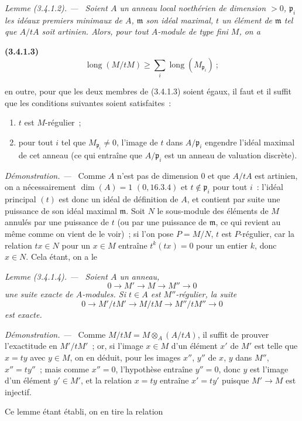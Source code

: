 \documentclass[10pt,oneside]{book}
\newcommand{\oldpage}[2][]{%
  \setcounter{footnote}{0}%
  \marginpar{\scriptsize\textbf{#1}~|~#2}\ignorespaces}
\newenvironment{env}[1][]{\par\medskip\noindent\textbf{(#1)}\ }{\par}
\newenvironment{lemma}[1][]{%
  \par\medskip\noindent\itshape Lemme (#1). ---\ }{\par}
\newenvironment{proof}{%
  \par\medskip\noindent\textit{Démonstration. ---\ }}{\par}
\begin{document}
\begin{lemma}[3.4.1.2]
\label{IV.2.3.4.1.2-fr}
Soient $A$ un anneau local noethérien de dimension $>0$, $\mathfrak p_i$ les
idéaux premiers minimaux de $A$, $\mathfrak m$ son idéal maximal, $t$ un
élément de $\mathfrak m$ tel que $A/tA$ soit artinien. Alors, pour tout
$A$-module de type fini $M$, on a
\end{lemma}

\begin{env}[3.4.1.3]
\label{IV.2.3.4.1.3-fr}
\[
\operatorname{long}(M/tM)
\geqslant\sum_i\operatorname{long}(M_{\mathfrak p_i})~;
\]
\end{env}

en outre, pour que les deux membres de (3.4.1.3) soient égaux, il faut et il
suffit que les conditions suivantes soient satisfaites~:

\oldpage[IV-2]{47}

\begin{enumerate}
\item[$\alpha$)] $t$ est $M$-régulier~;
\item[$\beta$)] pour tout $i$ tel que $M_{\mathfrak p_i}\neq0$, l'image de $t$
dans $A/\mathfrak p_i$ engendre l'idéal maximal de cet anneau (ce qui entraîne
que $A/\mathfrak p_i$ est un anneau de valuation discrète).
\end{enumerate}

\begin{proof}
Comme $A$ n'est pas de dimension $0$ et que $A/tA$ est artinien, on a
nécessairement $\dim(A)=1$ $(0,16.3.4)$ et $t\notin\mathfrak p_i$ pour tout
$i$~: l'idéal principal $(t)$ est donc un idéal de définition de $A$, et
contient par suite une puissance de son idéal maximal $\mathfrak m$. Soit $N$
le sous-module des éléments de $M$ annulés par une puissance de $t$ (ou par
une puissance de $\mathfrak m$, ce qui revient au même comme on vient de le
voir)~; si l'on pose $P=M/N$, $t$ est $P$-régulier, car la relation $tx\in N$
pour un $x\in M$ entraîne $t^k(tx)=0$ pour un entier $k$, donc $x\in N$. Cela
étant, on a le

\begin{lemma}[3.4.1.4]
\label{IV.2.3.4.1.4-fr}
Soient $A$ un anneau,
\[
0\longrightarrow M'\longrightarrow M\longrightarrow M''\longrightarrow0
\]
une suite exacte de $A$-modules. Si $t\in A$ est $M''$-régulier, la suite
\[
0\longrightarrow M'/tM'\longrightarrow M/tM
\longrightarrow M''/tM''\longrightarrow0
\]
est exacte.
\end{lemma}

\begin{proof}
Comme $M/tM=M\otimes_A(A/tA)$, il suffit de prouver l'exactitude en $M'/tM'$~;
or, si l'image $x\in M$ d'un élément $x'$ de $M'$ est telle que $x=ty$ avec
$y\in M$, on en déduit, pour les images $x''$, $y''$ de $x$, $y$ dans $M''$,
$x''=ty''$~; mais comme $x''=0$, l'hypothèse entraîne $y''=0$, donc $y$ est
l'image d'un élément $y'\in M'$, et la relation $x=ty$ entraîne $x'=ty'$
puisque $M'\to M$ est injectif.
\end{proof}

Ce lemme étant établi, on en tire la relation
\end{proof}
\end{document}
